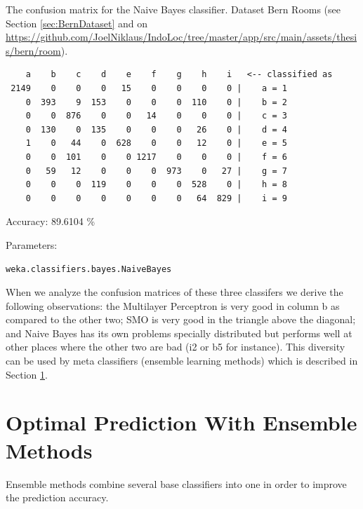 \begin{table}[H]
\caption{The confusion matrix for the Naive Bayes classifier. Dataset Bern Rooms (see Section \ref{sec:BernDataset} and on \url{https://github.com/JoelNiklaus/IndoLoc/tree/master/app/src/main/assets/thesis/bern/room}).}
\label{ver:ConfusionMatrixNaiveBayes}
\begin{threeparttable}
\begin{verbatim}
    a    b    c    d    e    f    g    h    i   <-- classified as
 2149    0    0    0   15    0    0    0    0 |    a = 1
    0  393    9  153    0    0    0  110    0 |    b = 2
    0    0  876    0    0   14    0    0    0 |    c = 3
    0  130    0  135    0    0    0   26    0 |    d = 4
    1    0   44    0  628    0    0   12    0 |    e = 5
    0    0  101    0    0 1217    0    0    0 |    f = 6
    0   59   12    0    0    0  973    0   27 |    g = 7
    0    0    0  119    0    0    0  528    0 |    h = 8
    0    0    0    0    0    0    0   64  829 |    i = 9
\end{verbatim}
\begin{tablenotes}
\item Accuracy: 89.6104 \%
\item Parameters:
\tiny{
\begin{verbatim}
weka.classifiers.bayes.NaiveBayes
\end{verbatim}
}
\end{tablenotes}
\end{threeparttable}
\end{table}

When we analyze the confusion matrices of these three classifers we derive the following observations: the Multilayer Perceptron is very good in column b as compared to the other two; SMO is very good in the triangle above the diagonal; and Naive Bayes has its own problems specially distributed but performs well at other places where the other two are bad (i2 or b5 for instance). This diversity can be used by meta classifiers (ensemble learning methods) which is described in Section \ref{sec:Ensemble}.



\section{Optimal Prediction With Ensemble Methods}
\label{sec:Ensemble}
Ensemble methods combine several base classifiers into one in order to improve the prediction accuracy.

